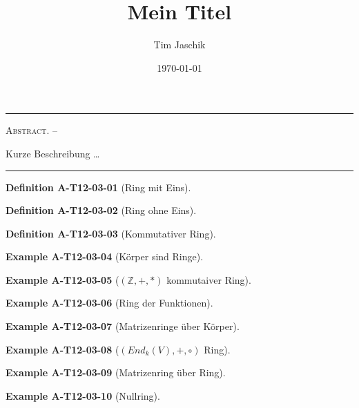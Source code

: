 \documentclass[10pt, letterpaper]{article}
\title{Mein Titel}
\author{Tim Jaschik}
\date{\today}
\newcommand{\Z}{\mathbb{Z}}
\renewenvironment{abstract}
  {
    \begin{adjustwidth}{1.5cm}{1.5cm}
    \small
    \textsc{Abstract. –}%
  }
  {
    \end{adjustwidth}
  }
\newcommand{\CustomHeading}[3]{%
  \par\medskip\noindent%
  \textbf{#1 #2} \textnormal{(#3)}.\enskip%
}
\newenvironment{DEF}[2]{\CustomHeading{Definition}{#1}{#2}}{}
\newenvironment{EXA}[2]{\CustomHeading{Example}{#1}{#2}}{}
\begin{document}
\maketitle
\rule{\textwidth}{0.5pt}
\begin{abstract}
Kurze Beschreibung …
\end{abstract}
\rule{\textwidth}{0.5pt}
\vspace{0.5cm}

\tableofcontents

\pagebreak




\begin{DEF}{A-T12-03-01}{Ring mit Eins}
\end{DEF}

\begin{DEF}{A-T12-03-02}{Ring ohne Eins}
\end{DEF}

\begin{DEF}{A-T12-03-03}{Kommutativer Ring}
\end{DEF}

\begin{EXA}{A-T12-03-04}{Körper sind Ringe}
\end{EXA}

\begin{EXA}{A-T12-03-05}{$(\Z,+,*)$ kommutaiver Ring}
\end{EXA}

\begin{EXA}{A-T12-03-06}{Ring der Funktionen}
\end{EXA}

\begin{EXA}{A-T12-03-07}{Matrizenringe über Körper}
\end{EXA}

\begin{EXA}{A-T12-03-08}{$(End_k(V),+,\circ)$ Ring}
\end{EXA}

\begin{EXA}{A-T12-03-09}{Matrizenring über Ring}
\end{EXA}

\begin{EXA}{A-T12-03-10}{Nullring}
\end{EXA}
\end{document}
